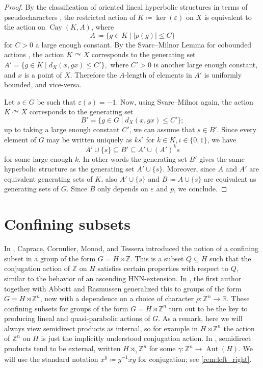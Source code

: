 \documentclass[reqno,12pt]{amsart}\setcounter{tocdepth}{1}
\theoremstyle{definition}
\newcommand{\Z}{\mathbb{Z}}
\newcommand{\R}{\mathbb{R}}
\DeclareMathOperator{\Aut}{Aut}
\DeclareMathOperator{\Cay}{Cay}
\numberwithin{equation}{section}
\begin{document}
\begin{proof}
By the classification of oriented lineal hyperbolic structures in terms of pseudocharacters \cite[Section 2.3]{ABO}, the restricted action of $K \coloneqq \ker(\varepsilon)$ on $X$ is equivalent to the action on $\Cay(K, A)$, where
\[A \coloneqq \{ g \in K \mid |p(g)| \leq C \}\]
for $C > 0$ a large enough constant. By the Svarc--Milnor Lemma for cobounded actions \cite[Lemma 3.11]{ABO}, the action $K \curvearrowright X$ corresponds to the generating set
\(A' = \{ g \in K \mid d_X(x, gx) \leq C' \},\)
where $C' > 0$ is another large enough constant, and $x$ is a point of $X$. Therefore the $A$-length of elements in $A'$ is uniformly bounded, and vice-versa.

Let $s \in G$ be such that $\varepsilon(s) = -1$. Now, using Svarc--Milnor again, the action $K \curvearrowright X$ corresponds to the generating set
\[B' = \{ g \in G \mid d_X(x, gx) \leq C' \};\]
up to taking a large enough constant $C'$, we can assume that $s \in B'$. Since every element of $G$ may be written uniquely as $ks^i$ for $k \in K, i \in \{0, 1\}$, we have
\[A' \cup \{ s \} \subseteq B' \subseteq A' \cup (A')^k s \]
for some large enough $k$. In other words the generating set $B'$ gives the same hyperbolic structure as the generating set $A' \cup \{ s \}$. Moreover, since $A$ and $A'$ are equivalent generating sets of $K$, also $A' \cup \{ s \}$ and $B \coloneqq A \cup \{ s \}$ are equivalent as generating sets of $G$. Since $B$ only depends on $\varepsilon$ and $p$, we conclude.
\end{proof}



\section{Confining subsets}\label{sec:confining}

In \cite{caprace15}, Caprace, Cornulier, Monod, and Tessera introduced the notion of a confining subset in a group of the form $G=H\rtimes \Z$. This is a subset $Q\subseteq H$ such that the conjugation action of $\Z$ on $H$ satisfies certain properties with respect to $Q$, similar to the behavior of an ascending HNN-extension. In \cite{confining}, the first author together with Abbott and Rasmussen generalized this to groups of the form $G=H\rtimes\Z^n$, now with a dependence on a choice of character $\rho\colon \Z^n\to\R$. These confining subsets for groups of the form $G=H\rtimes\Z^n$ turn out to be the key to producing lineal and quasi-parabolic actions of $G$. As a remark, here we will always view semidirect products as internal, so for example in $H\rtimes\Z^n$ the action of $\Z^n$ on $H$ is just the implicitly understood conjugation action. In \cite{caprace15,confining}, semidirect products tend to be external, written $H\rtimes_\gamma\Z^n$ for some $\gamma\colon \Z^n\to\Aut(H)$. We will use the standard notation $x^y\coloneqq y^{-1}xy$ for conjugation; see \cref{rem:left_right}.
\end{document}

